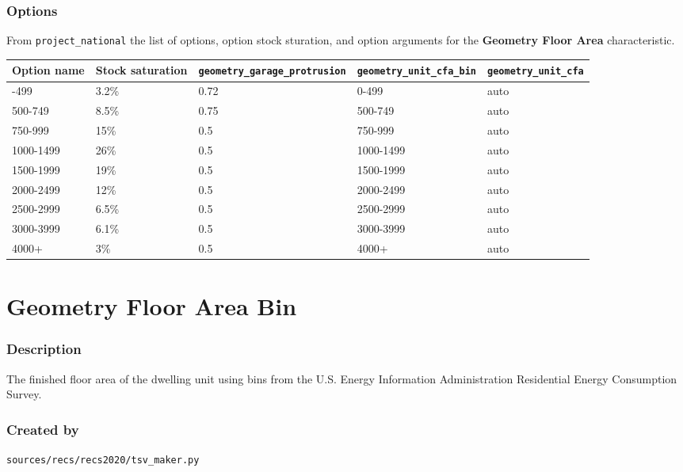 \subsubsection{Options}\label{options-52}

From \texttt{project\_national} the list of options, option stock
sturation, and option arguments for the \textbf{Geometry Floor Area}
characteristic.

\begin{longtable}[]{@{}lllll@{}}
\toprule\noalign{}
Option name & Stock saturation & \texttt{geometry\_garage\_protrusion} &
\texttt{geometry\_unit\_cfa\_bin} & \texttt{geometry\_unit\_cfa} \\
\midrule\noalign{}
\endhead
\bottomrule\noalign{}
\endlastfoot
0-499 & 3.2\% & 0.72 & 0-499 & auto \\
500-749 & 8.5\% & 0.75 & 500-749 & auto \\
750-999 & 15\% & 0.5 & 750-999 & auto \\
1000-1499 & 26\% & 0.5 & 1000-1499 & auto \\
1500-1999 & 19\% & 0.5 & 1500-1999 & auto \\
2000-2499 & 12\% & 0.5 & 2000-2499 & auto \\
2500-2999 & 6.5\% & 0.5 & 2500-2999 & auto \\
3000-3999 & 6.1\% & 0.5 & 3000-3999 & auto \\
4000+ & 3\% & 0.5 & 4000+ & auto \\
\end{longtable}

\section{Geometry Floor Area Bin}\label{geometry_floor_area_bin}

\subsubsection{Description}\label{description-53}

The finished floor area of the dwelling unit using bins from the U.S.
Energy Information Administration Residential Energy Consumption Survey.

\subsubsection{Created by}\label{created-by-53}

\texttt{sources/recs/recs2020/tsv\_maker.py}

